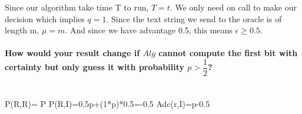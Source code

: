 \documentclass[paper=a4, fontsize=11pt]{scrartcl} %
\numberwithin{equation}{section} %
\numberwithin{figure}{section} %
\numberwithin{table}{section} %
\begin{document}
Since our algorithm take time T to run, $T=t$. We only need on call to make our decision which implies $q=1$. Since the text string we send to the oracle is of length m, $\mu=m$. And since we have advantage 0.5, this means $\epsilon\geq0.5$.

\paragraph{How would your result change if $Alg$ cannot compute the first bit with certainty but only guess it with probability $p>\dfrac{1}{2}$?} \hspace{1cm} \\



P(R,R)= P
P(R,I)=0,5p+(1*p)*0.5=-0.5
Adc(r,I)=p-0.5
\end{document}
